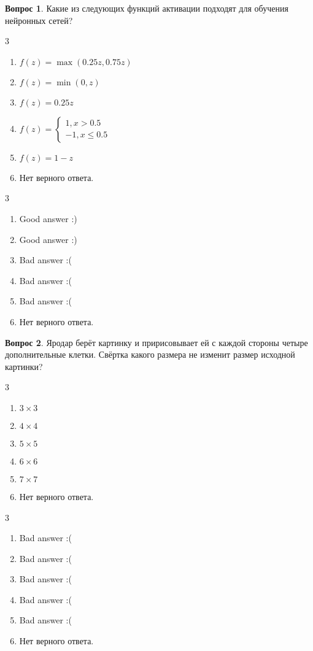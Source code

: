 \documentclass[12pt]{article}
\newenvironment{answerlist}[1][3]{
\begin{multicols}{#1}

\begin{enumerate}[label=\fbox{\emph{\Alph*}},ref=\emph{\alph*}]
}
{
\item Нет верного ответа.
\end{enumerate}
\end{multicols}
}
\theoremstyle{definition}
\newtheorem{question}{Вопрос}
\begin{document}
\begin{question}
Какие из следующих функций активации подходят для обучения нейронных сетей?
\begin{answerlist}
  \item \(f(z) = \max(0.25z, 0.75z) \)
  \item \(f(z) = \min(0, z) \)
  \item \(f(z) = 0.25 z \)
  \item \(f(z) = \begin{cases} 1, x > 0.5 \\ -1, x \le 0.5 \end{cases} \)
  \item \(f(z) = 1 - z \)
\end{answerlist}
\end{question}

\begin{solution}
\begin{answerlist}
  \item Good answer :)
  \item Good answer :)
  \item Bad answer :(
  \item Bad answer :(
  \item Bad answer :(
\end{answerlist}
\end{solution}

\begin{question}
Яродар берёт картинку и пририсовывает ей с каждой стороны четыре дополнительные клетки. Свёртка какого размера не изменит размер исходной картинки?  %
\begin{answerlist}
  \item \(3 \times 3\)
  \item \(4 \times 4\)
  \item \(5 \times 5\)
  \item \(6 \times 6\)
  \item \(7 \times 7\)
\end{answerlist}
\end{question}

\begin{solution}
\begin{answerlist}
  \item Bad answer :(
  \item Bad answer :(
  \item Bad answer :(
  \item Bad answer :(
  \item Bad answer :(
\end{answerlist}
\end{solution}
\end{document}
